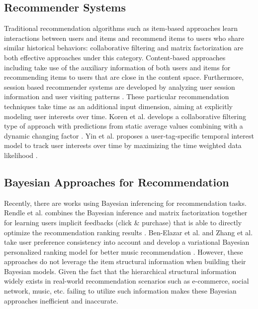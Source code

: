 \subsection{Recommender Systems}
Traditional recommendation algorithms such as item-based approaches learn interactions between users and items and recommend items to users who share similar historical behaviors: collaborative filtering \cite{Sarwar:2001:ICF:371920.372071,Su:2009:SCF:1592474.1722966} and matrix factorization \cite{Rendle:2010:FPM} are both effective approaches under this category.  Content-based approaches including \cite{2011rsh..book...73L,Liu:2011,Yuan:2015} take use of the auxiliary information of both users and items for recommending items to users that are close in the content space.  Furthermore, session based recommender systems are developed by analyzing user session information and user visiting patterns \cite{Gultekin_acollaborative,Tang_review:2013}. These particular recommendation techniques take time as an additional input dimension, aiming at explicitly modeling user interests over time.  Koren et al. develops a collaborative filtering type of approach with predictions from static average values combining with a dynamic changing factor \cite{Koren:2010}. Yin et al. proposes a user-tag-specific temporal interest model to track user interests over time by maximizing the time weighted data likelihood \cite{Yin:2011}.  %

\subsection{Bayesian Approaches for Recommendation}
Recently, there are works using Bayesian inferencing for recommendation tasks.  Rendle et al. combines the Bayesian inference and matrix factorization together for learning users implicit feedbacks (click \& purchase) that is able to directly optimize the recommendation ranking results \cite{rendle2009bpr}. Ben-Elazar et al. and Zhang et al.  take user preference consistency into account and develop a variational Bayesian personalized ranking model for better music recommendation \cite{Ben-Elazar:2017,zhang2007efficient}.  However, these approaches do not leverage the item structural information when building their Bayesian models.  Given the fact that the hierarchical structural information widely exists in real-world recommendation scenarios such as e-commerce, social network, music, etc. failing to utilize such information makes these Bayesian approaches inefficient and inaccurate.  

